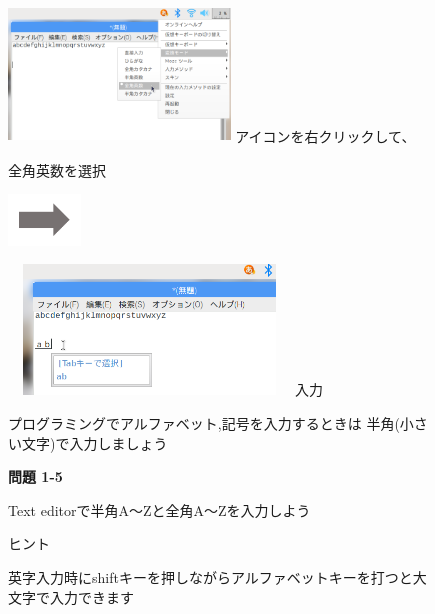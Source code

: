 \documentclass[a4paper,12pt]{jarticle}
\begin{document}
\begin{figure}[ht]
\begin{minipage}{7.173cm}
\includegraphics[width=5.889cm,height=3.596cm]{textbook-img069.png}
 アイコンを右クリックして、

全角英数を選択
\end{minipage}
\includegraphics[width=1.919cm,height=1.365cm]{textbook-img053.png}
\begin{minipage}{7.178cm}
\includegraphics[width=7.471cm,height=3.469cm]{textbook-img070.png}
 入力
\end{minipage}

\vspace{3mm}
\begin{minipage}{16.578cm}
{\centering\large
プログラミングでアルファベット,記号を入力するときは
半角(小さい文字)で入力しましょう
}
\end{minipage}

\flushleft
{\bfseries 問題 1-5}

Text editorで半角A〜Zと全角A〜Zを入力しよう　

ヒント


英字入力時にshiftキーを押しながらアルファベットキーを打つと大文字で入力できます
\end{figure}
\clearpage
\end{document}
